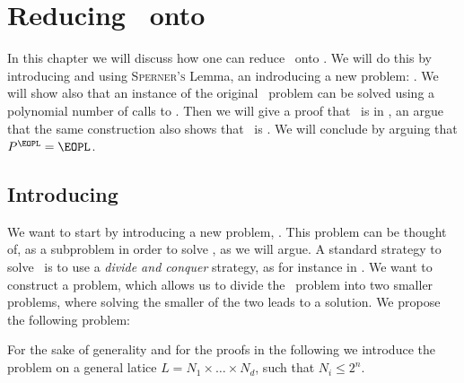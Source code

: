 \setchapterpreamble[u]{\margintoc}
\chapter{Reducing \Tarski\ onto \EOPL}

In this chapter we will discuss how one can reduce \Tarski\ onto \EOPL. We will do this by introducing and using \textsc{Sperner's} Lemma, an indroducing a new problem: \Tarskistar. We will show also that an instance of the original \Tarski\ problem can be solved using a polynomial number of calls to \Tarskistar. Then we will give a proof that \Tarskistar\ is in \PPAD, an argue that the same construction also shows that \Tarskistar\ is \EOPL. We will conclude by arguing that $P^{\EOPL} = \EOPL$.

\section{Introducing \Tarskistar}

We want to start by introducing a new problem, \Tarskistar. This problem can be thought of, as a subproblem in order to solve \Tarski, as we will argue. A standard strategy to solve \Tarski\ is to use a \emph{divide and conquer} strategy, as for instance in . We want to construct a problem, which allows us to divide the \Tarski\ problem into two smaller problems, where solving the smaller of the two leads to a solution. We propose the following problem:

For the sake of generality and for the proofs in the following we introduce the problem on a general latice $L = N_1 \times \dots \times N_d$, such that $N_i \leq 2^n$.

